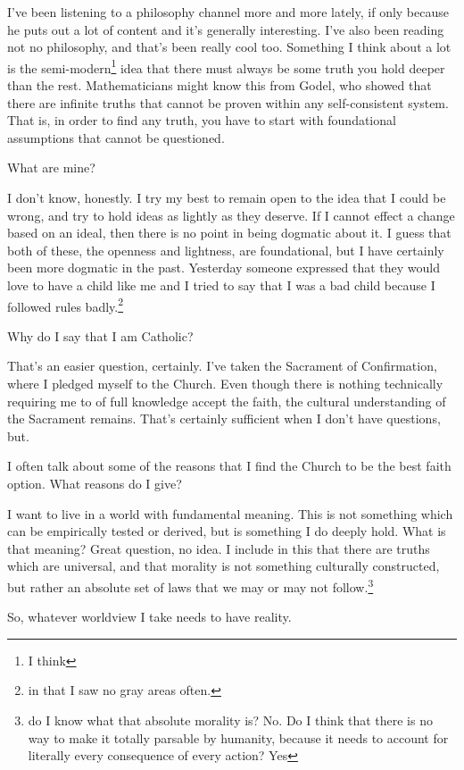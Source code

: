 \documentclass[12pt]{article}
\renewcommand{\,}{\textsuperscript{,}}
\begin{document}
I've been listening to a philosophy channel more and more lately, if only because he puts out a lot of content and it's generally interesting.  
I've also been reading not no philosophy, and that's been really cool too.  
Something I think about a lot is the semi-modern\footnote{I think} idea that there must always be some truth you hold deeper than the rest.  
Mathematicians might know this from Godel, who showed that there are infinite truths that cannot be proven within any self-consistent system.  
That is, in order to find any truth, you have to start with foundational assumptions that cannot be questioned.

What are mine?

I don't know, honestly.  
I try my best to remain open to the idea that I could be wrong, and try to hold ideas as lightly as they deserve.  
If I cannot effect a change based on an ideal, then there is no point in being dogmatic about it.  
I guess that both of these, the openness and lightness, are foundational, but I have certainly been more dogmatic in the past.  
Yesterday someone expressed that they would love to have a child like me and I tried to say that I was a bad child because I followed rules badly.\footnote{in that I saw no gray areas often.}

Why do I say that I am Catholic?

That's an easier question, certainly.  
I've taken the Sacrament of Confirmation, where I pledged myself to the Church.  
Even though there is nothing technically requiring me to of full knowledge accept the faith, the cultural understanding of the Sacrament remains.  
That's certainly sufficient when I don't have questions, but.

I often talk about some of the reasons that I find the Church to be the best faith option.  
What reasons do I give?

I want to live in a world with fundamental meaning.  
This is not something which can be empirically tested or derived, but is something I do deeply hold.  
What is that meaning?  
Great question, no idea.  
I include in this that there are truths which are universal, and that morality is not something culturally constructed, but rather an absolute set of laws that we may or may not follow.\footnote{do I know what that absolute morality is? No. Do I think that there is no way to make it totally parsable by humanity, because it needs to account for literally every consequence of every action? Yes}

So, whatever worldview I take needs to have reality.
\end{document}
